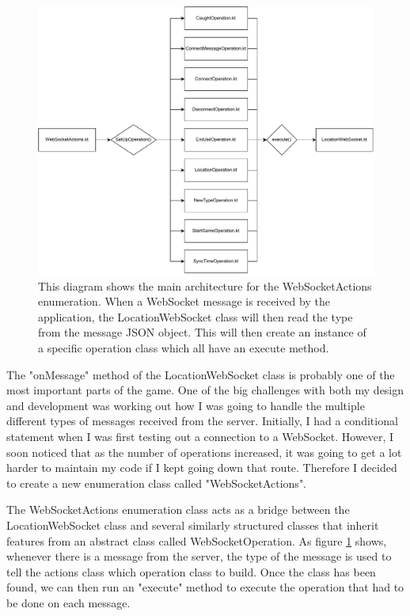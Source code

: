 \documentclass{l4proj}
\begin{document}
\begin{figure}
    \centering
    \includegraphics[width=\linewidth]{images/LocationActionsEnumDiagram.pdf}    

    \caption{
        This diagram shows the main architecture for the WebSocketActions enumeration. When a
        WebSocket message is received by the application, the LocationWebSocket class will then
        read the type from the message JSON object. This will then create an instance of a specific
        operation class which all have an execute method.   
    }

    \label{fig:locationActions} 
\end{figure}

The "onMessage" method of the LocationWebSocket class is probably one of the most important parts of the game.
One of the big challenges with both my design and development was working out how I was going to handle the multiple
different types of messages received from the server. Initially, I had a conditional statement when I was first
testing out a connection to a WebSocket. However, I soon noticed that as the number of operations increased, it
was going to get a lot harder to maintain my code if I kept going down that route. Therefore I decided to create
a new enumeration class called "WebSocketActions".

The WebSocketActions enumeration class acts as a bridge between the LocationWebSocket class and several similarly
structured classes that inherit features from an abstract class called WebSocketOperation. As figure \ref{fig:locationActions} shows, 
whenever there is a message from the server, the type of the message is used to tell the actions class which operation
class to build. Once the class has been found, we can then run an "execute" method to execute the operation that had
to be done on each message.
\end{document}
